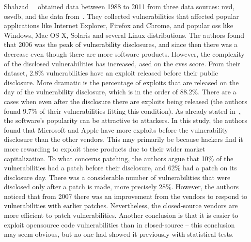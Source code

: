 Shahzad~\etal{}~\cite{Shahzad:2012} obtained data between 1988 to 2011 from three data sources: \gls{nvd}, \gls{osvdb}, and the data from~\cite{Frei:2006}. 
They collected vulnerabilities that affected popular applications like Internet Explorer, Firefox and Chrome, and popular \glspl{os} like Windows, Mac OS X, Solaris and several Linux distributions. 
The authors found that 2006 was the peak of vulnerability disclosures, and since then there was a decrease even though there are more software products. 
However, the complexity of the disclosed vulnerabilities has increased, ased on the \gls{cvss} score. 
From their dataset, 2.8\% vulnerabilities have an exploit released before their public disclosure. 
More dramatic is the percentage of exploits that are released on the day of the vulnerability disclosure, which is in the order of 88.2\%. 
There are a cases when even after the disclosure there are exploits being released (the authors found 9.7\% of their vulnerabilities fitting this condition). 
As already stated in~\cite{Gorbenko:2011}, the software’s popularity can be attractive to attackers. 
In this study, the authors found that Microsoft and Apple have more exploits before the vulnerability disclosure than the other vendors. 
This may primarily be because hackers find it more rewarding to exploit these products due to their wider market capitalization.
To what concerns patching, the authors argue that 10\% of the vulnerabilities had a patch before their disclosure, and 62\% had a patch on its disclosure day. 
There was a considerable number of vulnerabilities that were disclosed only after a patch is made, more precisely 28\%. 
However, the authors noticed that from 2007 there was an improvement from the vendors to respond to vulnerabilities with earlier patches. 
Nevertheless, the closed-source vendors are more efficient to patch vulnerabilities. 
Another conclusion is that it is easier to exploit opensource code vulnerabilities than in closed-source – this conclusion may seem obvious, but no one had showed it previously with statistical tests.


